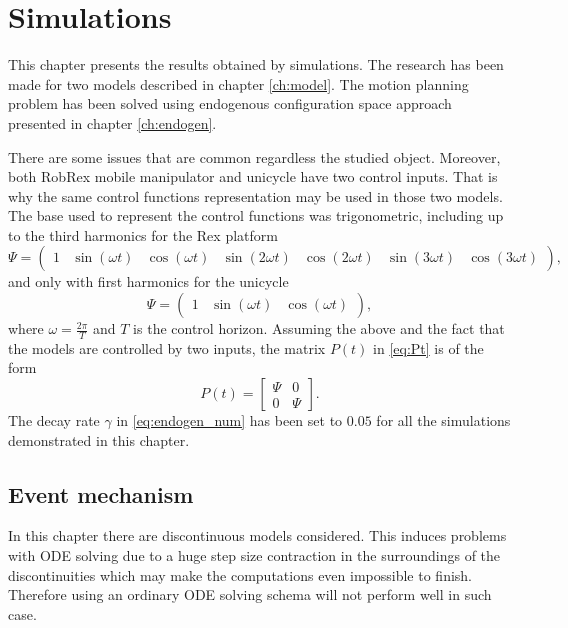 \chapter{Simulations}
This chapter presents the results obtained by simulations. The research has been made for two models
described in chapter \ref{ch:model}. The motion planning problem has been solved using endogenous
configuration space approach presented in chapter \ref{ch:endogen}.

There are some issues that are common regardless the studied object. Moreover,
both RobRex mobile manipulator and unicycle have two control inputs. That is why
the same control functions representation may be used in those two models.
The base used to represent the control functions was trigonometric, including up to the third harmonics
for the Rex platform
\begin{equation}
\Psi=\begin{pmatrix}
1 & \sin(\omega t) & \cos(\omega t)& \sin(2\omega t) & \cos(2\omega t)& \sin(3\omega t) & \cos(3\omega t)
\end{pmatrix},
\end{equation}
and only with first harmonics for the unicycle
\begin{equation}
\Psi=\begin{pmatrix}
1 & \sin(\omega t) & \cos(\omega t)
\end{pmatrix},
\end{equation}
where $\omega=\frac{2\pi}{T}$ and $T$ is the control horizon. Assuming the above and
the fact that the models are controlled by two inputs, the
matrix $P(t)$ in \eqref{eq:Pt} is of the form
\begin{equation}
P(t)=\begin{bmatrix}
\Psi & 0\\
0 & \Psi
\end{bmatrix}.
\end{equation}
The decay rate $\gamma$ in \eqref{eq:endogen_num} has been set to $0.05$ for all
the simulations demonstrated in this chapter.

\section{Event mechanism}
In this chapter there are discontinuous models considered. This induces problems with ODE solving
due to a huge step size contraction in the surroundings of the discontinuities which may
make the computations even impossible to finish. Therefore using an ordinary ODE solving
schema will not perform well in such case.

